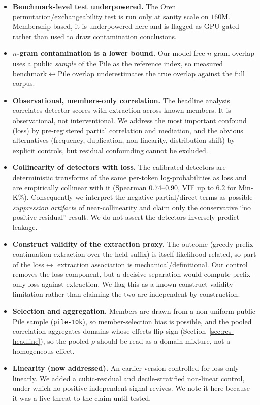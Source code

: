 \begin{itemize}
 observed \emph{zero} verbatim PII leakage at $160$M ($8/36$ documents contained PII in the held
 suffix, none were regurgitated). We report this as a null and make no PII-exposure claim. It is the
 reason assumption A3 of Section~\ref{sec:chain} is untested here rather than supported.
 \item \textbf{Benchmark-level test underpowered.} The Oren permutation/exchangeability test is run
 only at sanity scale on $160$M. Membership-based, it is underpowered here and is flagged as
 GPU-gated rather than used to draw contamination conclusions.
 \item \textbf{$n$-gram contamination is a lower bound.} Our model-free $n$-gram overlap uses a
 public \emph{sample} of the Pile as the reference index, so measured benchmark$\leftrightarrow$Pile
 overlap underestimates the true overlap against the full corpus.
 \item \textbf{Observational, members-only correlation.} The headline analysis correlates detector
 scores with extraction across known members. It is observational, not interventional. We address
 the most important confound (loss) by pre-registered partial correlation and mediation, and the
 obvious alternatives (frequency, duplication, non-linearity, distribution shift) by explicit
 controls, but residual confounding cannot be excluded.
 \item \textbf{Collinearity of detectors with loss.} The calibrated detectors are deterministic
 transforms of the same per-token log-probabilities as loss and are empirically collinear with it
 (Spearman $0.74$--$0.90$, VIF up to $6.2$ for Min-K\%). Consequently we interpret the negative
 partial/direct terms as possible \emph{suppression artifacts} of near-collinearity and claim only
 the conservative ``no positive residual'' result. We do not assert the detectors inversely predict
 leakage.
 \item \textbf{Construct validity of the extraction proxy.} The outcome (greedy prefix-continuation
 extraction over the held suffix) is itself likelihood-related, so part of the loss$\leftrightarrow$
 extraction association is mechanical/definitional. Our control removes the loss component, but a
 decisive separation would compute prefix-only loss against extraction. We flag this as a known
 construct-validity limitation rather than claiming the two are independent by construction.
 \item \textbf{Selection and aggregation.} Members are drawn from a non-uniform public Pile sample
 (\texttt{pile-10k}), so member-selection bias is possible, and the pooled correlation aggregates
 domains whose effects flip sign (Section~\ref{sec:res-headline}), so the pooled $\rho$ should be
 read as a domain-mixture, not a homogeneous effect.
 \item \textbf{Linearity (now addressed).} An earlier version controlled for loss only linearly. We
 added a cubic-residual and decile-stratified non-linear control, under which no positive
 independent signal revives. We note it here because it was a live threat to the claim until tested.
\end{itemize}
